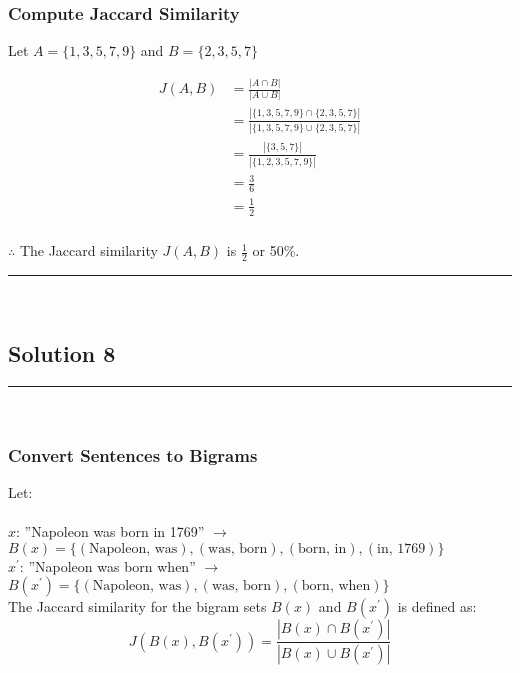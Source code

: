 \documentclass{article}
\begin{document}
\subsubsection*{Compute Jaccard Similarity}
\parbox{\textwidth}{
Let $A = \{1, 3, 5, 7, 9\}$ and $B = \{2, 3, 5, 7\}$

\begin{align*}
    J(A, B) &= \frac{|A \cap B|}{|A \cup B|} \\
    &= \frac{|\{1, 3, 5, 7, 9\} \cap \{2, 3, 5, 7\}|}{|\{1, 3, 5, 7, 9\} \cup \{2, 3, 5, 7\}|} \\
    &= \frac{|\{3, 5, 7\}|}{|\{1, 2, 3, 5, 7, 9\}|} \\
    &= \frac{3}{6} \\
    &= \frac{1}{2}
\end{align*}
}

\subsubsection*{\normalfont}{$\therefore$ The Jaccard similarity $J(A, B)$ is $\frac{1}{2}$ or 50\%.}

\noindent\rule{\textwidth}{0.4pt}\\

\newpage

\subsection*{Solution 8}
\noindent\rule{\textwidth}{0.4pt}\\
\subsubsection*{Convert Sentences to Bigrams}
\parbox{\textwidth}{
Let: \\
\\
$x$: ''Napoleon was born in 1769'' $\rightarrow$ $B(x) = \{(\text{Napoleon, was}), (\text{was, born}), (\text{born, in}), (\text{in, 1769})\}$
\\
$x^{\prime}$: ''Napoleon was born when'' $\rightarrow$ $B(x^{\prime}) = \{(\text{Napoleon, was}), (\text{was, born}), (\text{born, when})\}$
\\
The Jaccard similarity for the bigram sets $B(x)$ and $B(x^{\prime})$ is defined as:
$$J(B(x), B(x^{\prime})) = \frac{|B(x) \cap B(x^{\prime})|}{|B(x) \cup B(x^{\prime})|}$$
}
\end{document}
